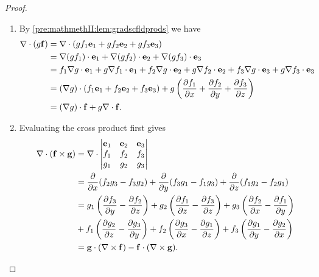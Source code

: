 \documentclass[10pt, a4paper]{article}
\begin{document}
\begin{proposition}
\begin{proof}
\begin{enumerate}[label = (\roman*)]
            \item By \autoref{pre:mathmethII:lem:gradscfldprods} we have
            \begin{align*}
                \bnabla \cdot (g\vec{f}) &= \bnabla \cdot (gf_1\vec{e}_1 + gf_2\vec{e}_2 + gf_3\vec{e}_3) \\
                &= \bnabla (gf_1)\cdot\vec{e}_1 + \bnabla (gf_2)\cdot\vec{e}_2 + \bnabla(gf_3)\cdot\vec{e}_3 \\
                &= f_1\bnabla g \cdot \vec{e}_1 + g\bnabla f_1 \cdot \vec{e}_1 + f_2\bnabla g \cdot \vec{e}_2 + g\bnabla f_2 \cdot \vec{e}_2 + f_3\bnabla g \cdot \vec{e}_3 + g\bnabla f_3 \cdot \vec{e}_3 \\
                &= (\bnabla g)\cdot(f_1\vec{e}_1 + f_2\vec{e}_2 + f_3\vec{e}_3) + g\left(\pd[f_1]{x} + \pd[f_2]{y} + \pd[f_3]{z}\right) \\
                &= (\bnabla g)\cdot\vec{f} + g\bnabla\cdot\vec{f}.
            \end{align*}

            \item Evaluating the cross product first gives
            \begin{align*}
                \bnabla \cdot (\vec{f} \times \vec{g}) &= \bnabla \cdot \begin{vmatrix}
                    \vec{e}_1 & \vec{e}_2 & \vec{e}_3 \\
                    f_1 & f_2 & f_3 \\
                    g_1 & g_2 & g_3
                \end{vmatrix} \\
                &= \pd{x}(f_2g_3 - f_3g_2) + \pd{y}(f_3g_1 - f_1g_3) + \pd{z}(f_1g_2 - f_2g_1) \\
                &= g_1\left(\pd[f_3]{y} - \pd[f_2]{z}\right) + g_2\left(\pd[f_1]{z} - \pd[f_3]{z}\right) + g_3\left(\pd[f_2]{x} - \pd[f_1]{y}\right) \\
                &+ f_1\left(\pd[g_2]{z} - \pd[g_3]{y}\right) + f_2\left(\pd[g_3]{x} - \pd[g_1]{z}\right) + f_3\left(\pd[g_1]{y} - \pd[g_2]{x}\right) \\
                &= \vec{g}\cdot(\bnabla \times \vec{f}) - \vec{f}\cdot(\bnabla \times \vec{g}).
            \end{align*}


\end{enumerate}
\end{proof}
\end{proposition}
\end{document}
